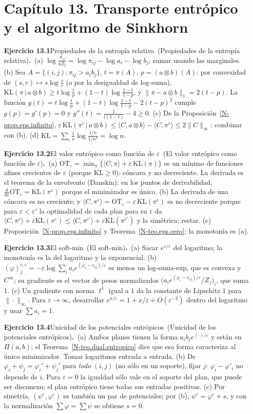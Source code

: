 \documentclass[11pt,a4paper]{amsart}
\newcommand{\ve}{\varepsilon}
\theoremstyle{remark}
\theoremstyle{definition}
\numberwithin{subsection}{section}
\numberwithin{equation}{section}
\newcommand{\ejlabel}[2]{\par\medskip\noindent\textbf{Ejercicio #1}\ifx\relax#2\relax\else\ (#2)\fi\textbf{.}\ }
\begin{document}
\section*{Capítulo 13. Transporte entrópico y el algoritmo de Sinkhorn}
\ejlabel{13.1}{Propiedades de la entropía relativa}(a) $\log\frac{\pi_{ij}}{a_ib_j}=\log\pi_{ij}-\log a_i-\log b_j$; sumar usando las marginales. (b) Sea $A=\{(i,j):\pi_{ij}>a_ib_j\}$, $t=\pi(A)$, $p=(a\otimes b)(A)$: por convexidad de $(s,r)\mapsto s\log\frac sr$ (o por la desigualdad de log-suma), $\mathrm{KL}(\pi\,|\,a\otimes b)\ge t\log\frac tp+(1-t)\log\frac{1-t}{1-p}$, y $\|\pi-a\otimes b\|_1=2(t-p)$. La función $g(t)=t\log\frac tp+(1-t)\log\frac{1-t}{1-p}-2(t-p)^2$ cumple $g(p)=g'(p)=0$ y $g''(t)=\frac1{t(1-t)}-4\ge0$. (c) De la Proposición~\ref{N-prop.eps.infinito}, $\ve\,\mathrm{KL}(\pi^\ve\,|\,a\otimes b)\le\langle C,a\otimes b\rangle-\langle C,\pi^\ve\rangle\le2\|C\|_\infty$; combinar con (b). (d) $\mathrm{KL}=\sum_i\frac1n\log\frac{1/n}{1/n^2}=\log n$.

\ejlabel{13.2}{El valor entrópico como función de $\ve$}(a) $\mathrm{OT}_\ve=\min_\pi\{\langle C,\pi\rangle+\ve\,\mathrm{KL}(\pi)\}$ es un mínimo de funciones afines crecientes de $\ve$ (porque $\mathrm{KL}\ge0$): cóncava y no decreciente. La derivada es el teorema de la envolvente (Danskin): en los puntos de derivabilidad, $\frac d{d\ve}\mathrm{OT}_\ve=\mathrm{KL}(\pi^\ve)$ porque el minimizador es único. (b) La derivada de una cóncava es no creciente; y $\langle C,\pi^\ve\rangle=\mathrm{OT}_\ve-\ve\,\mathrm{KL}(\pi^\ve)$ es no decreciente porque para $\ve<\ve'$ la optimalidad de cada plan para su $\ve$ da $\langle C,\pi^\ve\rangle+\ve\mathrm{KL}(\pi^\ve)\le\langle C,\pi^{\ve'}\rangle+\ve\mathrm{KL}(\pi^{\ve'})$ y la simétrica; restar. (c) Proposición~\ref{N-prop.eps.infinito} y Teorema~\ref{N-teo.eps.cero}; la monotonía es (a).

\ejlabel{13.3}{El soft-min}(a) Sacar $e^{s/\ve}$ del logaritmo; la monotonía es la del logaritmo y la exponencial. (b) $(\varphi)^{c,\ve}_j=-\ve\log\sum_ia_ie^{(\varphi_i-c_{ij})/\ve}$ es menos un log-suma-exp, que es convexa y $C^\infty$; su gradiente es el vector de pesos normalizados $\bigl(a_ie^{(\varphi_i-c_{ij})/\ve}/Z_j\bigr)_i$, que suma $1$. (c) Un gradiente con norma $\ell^1$ igual a $1$ da la constante de Lipschitz $1$ para $\|\cdot\|_\infty$. Para $\ve\to\infty$, desarrollar $e^{x/\ve}=1+x/\ve+O(\ve^{-2})$ dentro del logaritmo y usar $\sum a_i=1$.

\ejlabel{13.4}{Unicidad de los potenciales entrópicos}(a) Ambos planes tienen la forma $a_ib_je^{(\cdot)/\ve}$ y están en $\Pi(a,b)$; el Teorema~\ref{N-teo.dual.entropico} dice que esa forma caracteriza al único minimizador. Tomar logaritmos entrada a entrada. (b) De $\varphi_i+\psi_j=\varphi_i'+\psi_j'$ para \emph{todo} $(i,j)$ (no sólo en un soporte), fijar $j$: $\varphi_i-\varphi'_i$ no depende de $i$. Para $\ve=0$ la igualdad sólo vale en el soporte del plan, que puede ser disconexo; el plan entrópico tiene todas sus entradas positivas. (c) Por simetría, $(\psi^\ve,\varphi^\ve)$ es también un par de potenciales; por (b), $\psi^\ve=\varphi^\ve+s$, y con la normalización $\sum\varphi=\sum\psi$ se obtiene $s=0$.
\end{document}
